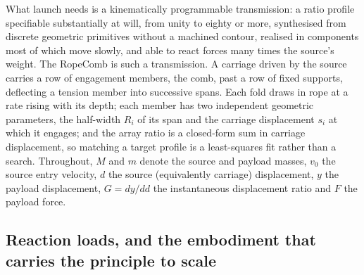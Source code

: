 \documentclass[preprint,12pt,number]{elsarticle}
\begin{document}
What launch needs is a kinematically programmable transmission: a ratio profile specifiable substantially at will, from unity to eighty or more, synthesised from discrete geometric primitives without a machined contour, realised in components most of which move slowly, and able to react forces many times the source's weight. The RopeComb is such a transmission. A carriage driven by the source carries a row of engagement members, the comb, past a row of fixed supports, deflecting a tension member into successive spans. Each fold draws in rope at a rate rising with its depth; each member has two independent geometric parameters, the half-width $R_i$ of its span and the carriage displacement $s_i$ at which it engages; and the array ratio is a closed-form sum in carriage displacement, so matching a target profile is a least-squares fit rather than a search. Throughout, $M$ and $m$ denote the source and payload masses, $v_0$ the source entry velocity, $d$ the source (equivalently carriage) displacement, $y$ the payload displacement, $G = dy/dd$ the instantaneous displacement ratio and $F$ the payload force.

\subsection{Reaction loads, and the embodiment that carries the principle to scale}
\end{document}
